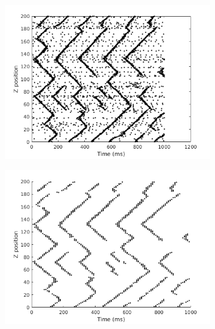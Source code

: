 \documentclass[12pt]{article}
\begin{document}
\begin{figure}[!htb]
 \centering
 \begin{subfigure}{0.33\textwidth}
  \centering
  \includegraphics[width=\textwidth]{fig/2x2_firings}
 \end{subfigure}%
 \begin{subfigure}{0.33\textwidth}
  \centering
  \includegraphics[width=\textwidth]{fig/2x2_density_filter}
 \end{subfigure}%
 \begin{subfigure}{0.33\textwidth}
  \centering

\end{subfigure}
\end{figure}
\end{document}
